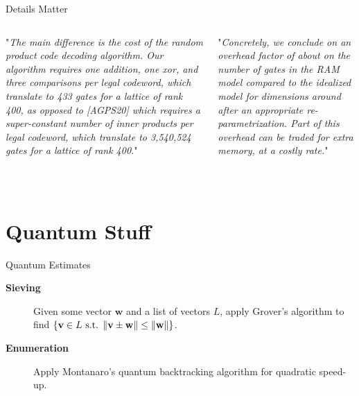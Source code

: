 \documentclass[table,10pt,aspectratio=169]{beamer}
\renewcommand{\vec}[1]{\ensuremath{\mathbf{#1}}\xspace}
\begin{document}
\begin{frame}[label={sec:org64cdffc}]{Details Matter}
\begin{columns}[t]
\begin{column}{0.5\columnwidth}
"\emph{The main difference is the cost of the random product code decoding algorithm. Our algorithm requires one addition, one xor, and three comparisons per legal codeword, which translate to 433 gates for a lattice of rank 400, as opposed to [AGPS20] which requires a super-constant number of inner products per legal codeword, which translate to 3,540,524 gates for a lattice of rank 400.}"

\ \\
\scriptsize

\end{column}

\begin{column}{0.5\columnwidth}
"\emph{Concretely, we conclude on an overhead factor of about  on the number of gates in the RAM model compared to the idealized model for dimensions around  after an appropriate re-parametrization. Part of this overhead can be traded for extra memory, at a costly rate.}"

\ \\
\scriptsize

\end{column}
\end{columns}
\end{frame}

\section{Quantum Stuff}
\label{sec:org8491de5}
\begin{frame}[label={sec:orgff1cdf3}]{Quantum Estimates}
\begin{description}
\item[{{\color{LightRed} \textbf{Sieving} }}] Given some vector \(\vec{w}\) and a list of vectors \(L\), apply Grover’s algorithm to find \(\{\vec{v} \in L \textnormal{ s.t. } \|\vec{v} \pm \vec{w}\| \leq \|\vec{w}\|\}\).

\item[{{\color{DarkBlue} \textbf{Enumeration} }}] Apply Montanaro’s quantum backtracking algorithm for quadratic speed-up.
\end{description}
\end{frame}
\end{document}
